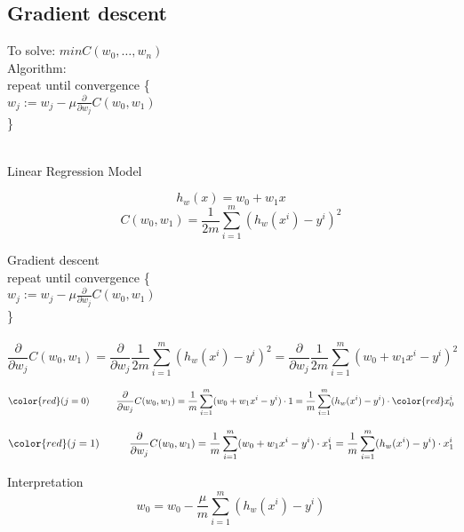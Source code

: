 \documentclass[12pt]{article}
\newcommand\tab[1][1cm]{\hspace*{#1}}
\begin{document}
\subsection{Gradient descent}
To solve: $minC(w_0,\hdots,w_n)$\\
Algorithm:\\
\tab repeat until convergence \{\\
\tab \tab $w_j:=w_j-\mu\frac{\partial}{\partial w_j}C(w_0,w_1)$\\
\tab \}\\
\\
\begin{center}
Linear Regression Model\\
\end{center}
\begin{equation}
h_w(x)=w_0+w_1x
\end{equation}
\begin{equation}
C(w_0,w_1)=\frac{1}{2m}\sum_{i=1}^{m}(h_w(x^{i})-y^{i})^2
\end{equation}

\tab Gradient descent\\
\tab repeat until convergence \{\\
\tab \tab $w_j:=w_j-\mu\frac{\partial}{\partial w_j}C(w_0,w_1)$\\
\tab \}\\
\\
\begin{equation}
\frac{\partial}{\partial w_j}C(w_0,w_1)=\frac{\partial}{\partial w_j}\frac{1}{2m}\sum_{i=1}^{m}(h_w(x^{i})-y^{i})^2
=\frac{\partial}{\partial w_j}\frac{1}{2m}\sum_{i=1}^{m}(w_0+w_1x^i-y^{i})^2
\end{equation}

\begin{equation}
{\color{red} (j=0)} \tab  \frac{\partial}{\partial w_j}C(w_0,w_1)=\frac{1}{m}\sum_{i=1}^{m}(w_0+w_1x^i-y^{i})\cdot 1=\frac{1}{m}\sum_{i=1}^{m}(h_w(x^{i})-y^{i})\cdot {\color{red}x_0^i}
\end{equation}

\begin{equation}
{\color{red} (j=1)} \tab  \frac{\partial}{\partial w_j}C(w_0,w_1)=\frac{1}{m}\sum_{i=1}^{m}(w_0+w_1x^i-y^{i})\cdot x_1^i=\frac{1}{m}\sum_{i=1}^{m}(h_w(x^{i})-y^{i})\cdot x_1^i
\end{equation}

Interpretation\\
\begin{equation}
w_0=w_0-\frac{\mu}{m}\sum_{i=1}^{m}(h_w(x^{i})-y^{i})
\end{equation}
\end{document}
